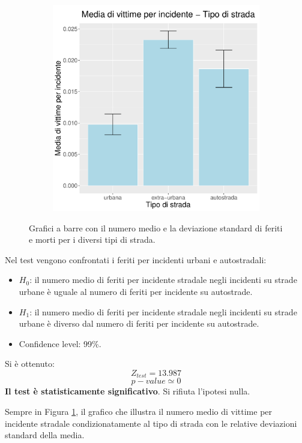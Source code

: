 \documentclass[12pt,a4paper,final,oneside]{article}			%
\begin{document}
\begin{figure}[h]
\begin{subfigure}{0.4\textwidth}
                \includegraphics[scale=0.4]{../results/media_morti_per_incidente_tipo_strada.pdf}
            \end{subfigure}
            \caption{Grafici a barre con il numero medio e la deviazione standard di feriti e morti per i diversi tipi di strada.}
            \label{Fig: feriti_morti_tipo_strada}
        \end{figure}        
        Nel test vengono confrontati i feriti per incidenti urbani e autostradali:
        \begin{itemize}
            \item $H_0$: il numero medio di feriti per incidente stradale negli incidenti su strade urbane è uguale al numero di feriti per incidente su autostrade.
            \item $H_1$: il numero medio di feriti per incidente stradale negli incidenti su strade urbane è diverso dal numero di feriti per incidente su autostrade.
            \item Confidence level: 99\%.
        \end{itemize}
        Si è ottenuto:
        \[
            Z_{test} = 13.987
        \]
        \[
            p-value \simeq 0
        \]
        \textbf{Il test è statisticamente significativo}. Si rifiuta l’ipotesi nulla.
        
        Sempre in Figura \ref{Fig: feriti_morti_tipo_strada}, il grafico che illustra il numero medio di vittime per incidente stradale condizionatamente al tipo di strada con le relative deviazioni standard della media.
        
\end{document}
